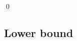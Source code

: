 \documentclass[review]{elsarticle}
\begin{document}
%	
\qed




\subsection{Lower bound}
\end{document}
